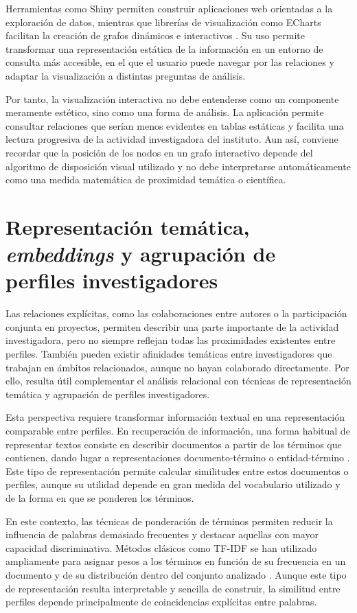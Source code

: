 \documentclass[11pt,spanish,listoffigures,listoftables]{tfgetsinf}
\begin{document}
Herramientas como Shiny permiten construir aplicaciones web orientadas a la exploración de datos, mientras que librerías de visualización como ECharts facilitan la creación de grafos dinámicos e interactivos \cite{shiny,echarts}. Su uso permite transformar una representación estática de la información en un entorno de consulta más accesible, en el que el usuario puede navegar por las relaciones y adaptar la visualización a distintas preguntas de análisis.

Por tanto, la visualización interactiva no debe entenderse como un componente meramente estético, sino como una forma de análisis. La aplicación permite consultar relaciones que serían menos evidentes en tablas estáticas y facilita una lectura progresiva de la actividad investigadora del instituto. Aun así, conviene recordar que la posición de los nodos en un grafo interactivo depende del algoritmo de disposición visual utilizado y no debe interpretarse automáticamente como una medida matemática de proximidad temática o científica.

\section{Representación temática, \textit{embeddings} y agrupación de perfiles investigadores}

Las relaciones explícitas, como las colaboraciones entre autores o la participación conjunta en proyectos, permiten describir una parte importante de la actividad investigadora, pero no siempre reflejan todas las proximidades existentes entre perfiles. También pueden existir afinidades temáticas entre investigadores que trabajan en ámbitos relacionados, aunque no hayan colaborado directamente. Por ello, resulta útil complementar el análisis relacional con técnicas de representación temática y agrupación de perfiles investigadores.

Esta perspectiva requiere transformar información textual en una representación comparable entre perfiles. En recuperación de información, una forma habitual de representar textos consiste en describir documentos a partir de los términos que contienen, dando lugar a representaciones documento-término o entidad-término \cite{manning}. Este tipo de representación permite calcular similitudes entre estos documentos o perfiles, aunque su utilidad depende en gran medida del vocabulario utilizado y de la forma en que se ponderen los términos.

En este contexto, las técnicas de ponderación de términos permiten reducir la influencia de palabras demasiado frecuentes y destacar aquellas con mayor capacidad discriminativa. Métodos clásicos como TF-IDF se han utilizado ampliamente para asignar pesos a los términos en función de su frecuencia en un documento y de su distribución dentro del conjunto analizado \cite{salton,manning}. Aunque este tipo de representación resulta interpretable y sencilla de construir, la similitud entre perfiles depende principalmente de coincidencias explícitas entre palabras.
\end{document}
